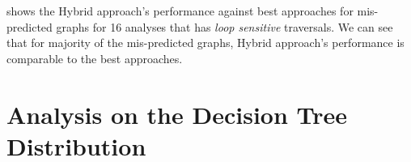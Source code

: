 

 shows the Hybrid approach's performance against best 
approaches for mis-predicted graphs for 16 analyses that has \emph{loop sensitive} traversals. We can see that for 
majority of the mis-predicted graphs, Hybrid approach's performance is 
comparable to the best approaches. 

\section{Analysis on the Decision Tree Distribution}
\label{sec:analysis-decision-tree}






